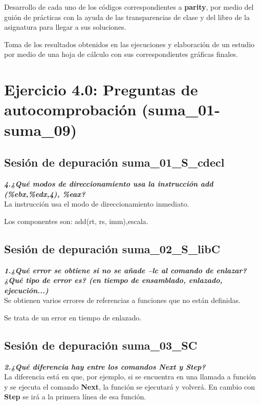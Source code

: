 Desarrollo de cada uno de los códigos correspondientes a \textbf{parity}, por medio
del guión de prácticas con la ayuda de las transparencias de clase y del libro de la asignatura
para llegar a sus soluciones.

Toma de los resultados obtenidos en las ejecuciones y elaboración de un estudio por 
medio de una hoja de cálculo con sus correspondientes gráficas finales.

\newpage

\section{Ejercicio 4.0: Preguntas de autocomprobación (suma\_01-suma\_09)}
\subsection{Sesión de depuración suma\_01\_S\_cdecl}
\textbf{\textit{4.¿Qué modos de direccionamiento usa la instrucción add (\%ebx,\%edx,4), \%eax?}}
\\

La instrucción usa el modo de direccionamiento inmediato.

Los componentes son: add(rt, rs, imm),escala.

\subsection{Sesión de depuración suma\_02\_S\_libC}
\textbf{\textit{1.¿Qué error se obtiene si no se añade –lc al comando de enlazar? ¿Qué tipo de error es? (en tiempo de ensamblado, enlazado, ejecución...)
}}
\\

Se obtienen varios errores de referencias a funciones que no están definidas.

Se trata de un error en tiempo de enlazado.

\subsection{Sesión de depuración suma\_03\_SC}
\textbf{\textit{2.¿Qué diferencia hay entre los comandos Next y Step?}}
\\

La diferencia está en que, por ejemplo, si se encuentra en una llamada a función y se ejecuta el comando \textbf{Next}, la función se ejecutará y volverá. En cambio con \textbf{Step} se irá a la primera línea de esa función.


